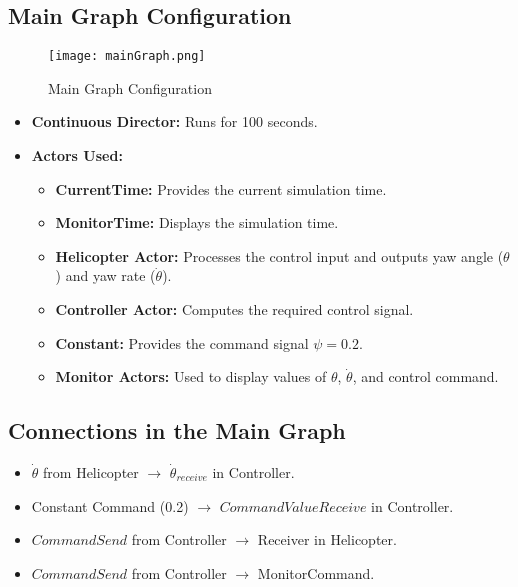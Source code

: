 \documentclass{article}
\begin{document}
\subsection{Main Graph Configuration}
\begin{figure}
    \centering
    \texttt{[image: mainGraph.png]}
    \caption{Main Graph Configuration}
    \label{fig:main_graph}
\end{figure}
\begin{itemize}
    \item \textbf{Continuous Director:} Runs for 100 seconds.
    \item \textbf{Actors Used:}
    \begin{itemize}
        \item \textbf{CurrentTime:} Provides the current simulation time.
        \item \textbf{MonitorTime:} Displays the simulation time.
        \item \textbf{Helicopter Actor:} Processes the control input and outputs yaw angle ($\theta$) and yaw rate ($\dot{\theta}$).
        \item \textbf{Controller Actor:} Computes the required control signal.
        \item \textbf{Constant:} Provides the command signal $\psi = 0.2$.
        \item \textbf{Monitor Actors:} Used to display values of $\theta$, $\dot{\theta}$, and control command.
    \end{itemize}
\end{itemize}

\subsection{Connections in the Main Graph}
\begin{itemize}
    \item $\dot{\theta}$ from Helicopter $\rightarrow$ $\dot{\theta}_{receive}$ in Controller.
    \item Constant Command (0.2) $\rightarrow$ $CommandValueReceive$ in Controller.
    \item $CommandSend$ from Controller $\rightarrow$ Receiver in Helicopter.
    \item $CommandSend$ from Controller $\rightarrow$ MonitorCommand.
\end{itemize}
\end{document}
